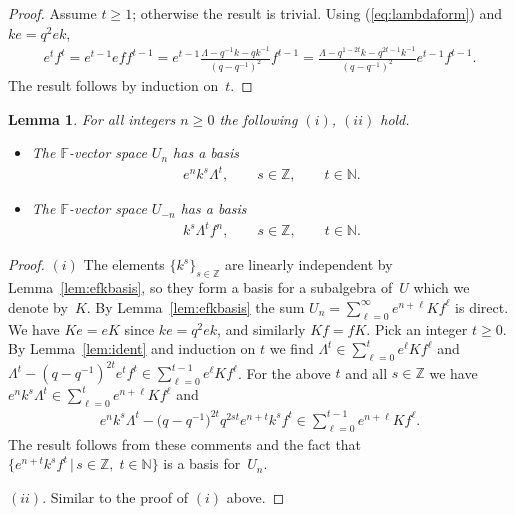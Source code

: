\documentclass[11pt]{article}
\numberwithin{equation}{section}
\newtheorem{Lemma}[Theorem]{Lemma}
\begin{document}
\begin{proof}
Assume $t\geq 1$; otherwise the result is trivial.
Using
(\ref{eq:lambdaform}) and $ke=q^2ek$,
\begin{gather*}
e^t f^t  =  e^{t-1} ef f^{t-1}
= e^{t-1} \frac{\Lambda -q^{-1}k-qk^{-1}}{(q-q^{-1})^2}f^{t-1}
 = \frac{\Lambda -q^{1-2t}k-q^{2t-1}k^{-1}}{(q-q^{-1})^2}e^{t-1}f^{t-1}.
\end{gather*}
The result follows by induction on~$t$.
\end{proof}



\begin{Lemma}
\label{lem:basisalt}
For all integers $n\geq 0$ the following $(i)$, $(ii)$ hold.
\begin{itemize}\itemsep=0pt
\item[$(i)$]
The $\mathbb F$-vector space $U_n$ has a basis
\begin{gather*}
e^n k^s \Lambda^t,
 \qquad s\in \mathbb Z, \qquad   t\in \mathbb N.
\end{gather*}
\item[$(ii)$]
The $\mathbb F$-vector space $U_{-n}$ has a basis
\begin{gather*}
k^s \Lambda^t  f^n,
 \qquad s\in \mathbb Z, \qquad   t\in \mathbb N.
\end{gather*}
\end{itemize}
\end{Lemma}

\begin{proof}
$(i)$ The elements
$\lbrace k^s\rbrace_{s \in \mathbb Z}$ are linearly
independent
by
Lemma~\ref{lem:efkbasis}, so they form
a basis for a subalgebra of~$U$ which we denote by~$K$.
By Lemma~\ref{lem:efkbasis}
the sum $U_n=\sum\limits_{\ell=0}^\infty e^{n+\ell} K f^\ell$ is direct.
We have
$Ke=eK$ since
$ke=q^2ek$, and
similarly $Kf=fK$.
Pick an integer $t\geq 0$.
By Lemma~\ref{lem:ident}  and induction on $t$
we f\/ind
$ \Lambda^t \in
\sum\limits_{\ell=0}^t e^\ell Kf^\ell$
and
$\Lambda^t -(q-q^{-1})^{2t} e^t f^t
\in
\sum\limits_{\ell=0}^{t-1} e^{\ell} K f^\ell $.
For the above $t$ and all $s\in \mathbb Z$
we have $e^n k^s \Lambda^t  \in
\sum\limits_{\ell=0}^t e^{n+\ell} K f^\ell $ and
\begin{gather*}
e^n k^s \Lambda^t - \big(q-q^{-1}\big)^{2t} q^{2st}e^{n+t}k^s f^t \in
\sum_{\ell=0}^{t-1} e^{n+\ell} K f^\ell.
\end{gather*}
The result follows
from these comments
and the fact that
$\lbrace
e^{n+t}k^s f^t \,|\, s\in \mathbb Z,\;t\in \mathbb N\rbrace$ is a basis for~$U_n$.

$(ii)$. Similar to the proof of $(i)$ above.
\end{proof}
\end{document}
